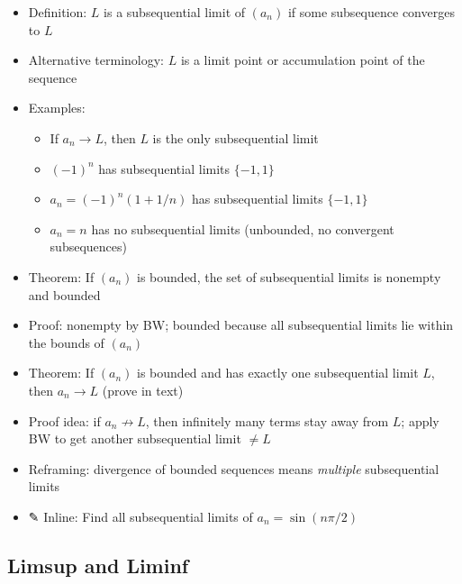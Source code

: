 \documentclass[
  10pt,
  letterpaper,
]{scrbook}
\providecommand{\tightlist}{%
  \setlength{\itemsep}{0pt}\setlength{\parskip}{0pt}}
\begin{document}
\begin{itemize}
\tightlist
\item
  Definition: \(L\) is a subsequential limit of \((a_n)\) if some
  subsequence converges to \(L\)
\item
  Alternative terminology: \(L\) is a limit point or accumulation point
  of the sequence
\item
  Examples:

  \begin{itemize}
  \tightlist
  \item
    If \(a_n \to L\), then \(L\) is the only subsequential limit
  \item
    \((-1)^n\) has subsequential limits \(\{-1, 1\}\)
  \item
    \(a_n = (-1)^n(1 + 1/n)\) has subsequential limits \(\{-1, 1\}\)
  \item
    \(a_n = n\) has no subsequential limits (unbounded, no convergent
    subsequences)
  \end{itemize}
\item
  Theorem: If \((a_n)\) is bounded, the set of subsequential limits is
  nonempty and bounded
\item
  Proof: nonempty by BW; bounded because all subsequential limits lie
  within the bounds of \((a_n)\)
\item
  Theorem: If \((a_n)\) is bounded and has exactly one subsequential
  limit \(L\), then \(a_n \to L\) (prove in text)
\item
  Proof idea: if \(a_n \not\to L\), then infinitely many terms stay away
  from \(L\); apply BW to get another subsequential limit \(\neq L\)
\item
  Reframing: divergence of bounded sequences means \emph{multiple}
  subsequential limits
\item
  ✎ Inline: Find all subsequential limits of \(a_n = \sin(n\pi/2)\)
\end{itemize}

\subsection{Limsup and Liminf}\label{limsup-and-liminf}
\end{document}
